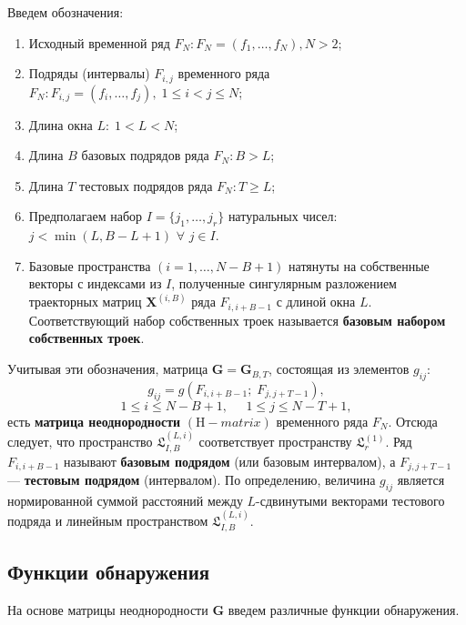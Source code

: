 \documentclass[specialist, substylefile = spbu.rtx,
			   subf, href, 12pt]{disser}
\begin{document}
Введем обозначения:
\begin{enumerate}
	
	\item
	Исходный временной ряд $ F_N: F_N = (f_1, \dotsc, f_{N}), N > 2 $;
	
	\item
	Подряды (интервалы) $ F_{i, j} $ временного ряда $ F_N: F_{i, j} = (f_{i}, \dotsc, f_{j}), \; 1 \leq i < j \leq N $;
	
	\item
	Длина окна $ L: \; 1 < L < N $;
	
	\item
	Длина $ B $ базовых подрядов ряда $ F_N: B > L $;
	
	\item
	Длина $ T $ тестовых подрядов ряда $ F_N: T \geq L $;
	
	\item
	Предполагаем набор $ I = \{j_1, \dotsc, j_r\} $ натуральных чисел: $ j < \min(L, B - L + 1) $ $ \forall $ $ j \in I $.
	
	\item
	Базовые пространства $ (i = 1, \dotsc, N - B + 1) $ натянуты на собственные векторы с индексами из $ I $, полученные сингулярным разложением траекторных матриц $ \mathbf{X}^{(i, B)} $ ряда $ F_{i, i+B-1} $ с длиной окна $ L $. Соответствующий набор собственных троек называется \textbf{базовым набором собственных троек}.
	
\end{enumerate}

Учитывая эти обозначения, матрица $ \mathbf{G} = \mathbf{G}_{B, T} $, состоящая из элементов $g_{ij}$:
\begin{equation} \label{eq:g_elements}
	g_{ij} = g(F_{i, i+B-1};\;F_{j, j+T-1}),
\end{equation}
$$1 \leq i \leq N-B+1,\;\;\;\;\; 1 \leq j \leq N-T+1,$$
есть \textbf{матрица неоднородности} $ (\mathrm{H}-matrix) $ временного ряда $ F_N $. Отсюда следует, что пространство $ \mathfrak{L}_{I, B}^{(L, i)} $ соответствует пространству $ \mathfrak{L}_r^{(1)} $. Ряд $ F_{i, i+B-1} $ называют \textbf{базовым подрядом} (или базовым интервалом), а $ F_{j, j+T-1} $ --- \textbf{тестовым подрядом} (интервалом). По определению, величина $g_{ij}$ является нормированной суммой расстояний между $L$-сдвинутыми векторами тестового подряда и линейным пространством $ \mathfrak{L}_{I, B}^{(L, i)} $. 

\subsection{Функции обнаружения}
На основе матрицы неоднородности $ \mathbf{G} $ введем различные функции обнаружения.
\end{document}
